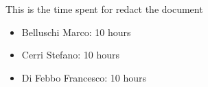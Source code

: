 This is the time spent for redact the document
\begin{itemize}
	\item Belluschi Marco: 10 hours
	\item Cerri Stefano: 10 hours
	\item Di Febbo Francesco: 10 hours
\end{itemize}